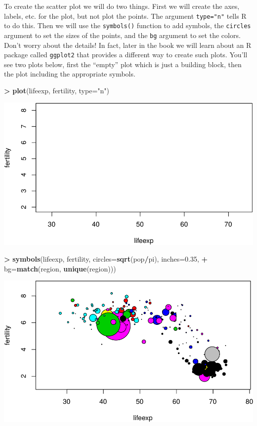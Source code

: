\documentclass[]{krantz}
\makeatletter
\newenvironment{Shaded}{\begin{snugshade}}{\end{snugshade}}
\newcommand{\DataTypeTok}[1]{\textcolor[rgb]{0.27,0.27,0.27}{#1}}
\newcommand{\FloatTok}[1]{\textcolor[rgb]{0.06,0.06,0.06}{#1}}
\newcommand{\KeywordTok}[1]{\textcolor[rgb]{0.27,0.27,0.27}{\textbf{#1}}}
\newcommand{\NormalTok}[1]{#1}
\newcommand{\OperatorTok}[1]{\textcolor[rgb]{0.43,0.43,0.43}{\textbf{#1}}}
\newcommand{\StringTok}[1]{\textcolor[rgb]{0.5,0.5,0.5}{#1}}
\newenvironment{kframe}{%
\medskip{}
\setlength{\fboxsep}{.8em}
 \def\at@end@of@kframe{}%
 \ifinner\ifhmode%
  \def\at@end@of@kframe{\end{minipage}}%
  \begin{minipage}{\columnwidth}%
 \fi\fi%
 \def\FrameCommand##1{\hskip\@totalleftmargin \hskip-\fboxsep
 \colorbox{shadecolor}{##1}\hskip-\fboxsep
     \hskip-\linewidth \hskip-\@totalleftmargin \hskip\columnwidth}%
 \MakeFramed {\advance\hsize-\width
   \@totalleftmargin\z@ \linewidth\hsize
   \@setminipage}}%
 {\par\unskip\endMakeFramed%
 \at@end@of@kframe}
\renewenvironment{Shaded}{\begin{kframe}}{\end{kframe}}
\makeatother
\begin{document}
To create the scatter plot we will do two things. First we will create the axes, labels, etc. for the plot, but not plot the points. The argument \texttt{type="n"} tells R to do this. Then we will use the \texttt{symbols()} function to add symbols, the \texttt{circles} argument to set the sizes of the points, and the \texttt{bg} argument to set the colors. Don't worry about the details! In fact, later in the book we will learn about an R package called
\texttt{ggplot2} that provides a different way to create such plots. You'll see two plots below, first the ``empty'' plot which is just a building block, then the plot including the appropriate symbols.

\begin{Shaded}
\begin{Highlighting}[]
\OperatorTok{>}\StringTok{ }\KeywordTok{plot}\NormalTok{(lifeexp, fertility, }\DataTypeTok{type=}\StringTok{"n"}\NormalTok{)}
\end{Highlighting}
\end{Shaded}

\includegraphics{bookdown_files/figure-latex/unnamed-chunk-15-1.pdf}

\begin{Shaded}
\begin{Highlighting}[]
\OperatorTok{>}\StringTok{ }\KeywordTok{symbols}\NormalTok{(lifeexp, fertility, }\DataTypeTok{circles=}\KeywordTok{sqrt}\NormalTok{(pop}\OperatorTok{/}\NormalTok{pi), }\DataTypeTok{inches=}\FloatTok{0.35}\NormalTok{, }
\OperatorTok{+}\StringTok{         }\DataTypeTok{bg=}\KeywordTok{match}\NormalTok{(region, }\KeywordTok{unique}\NormalTok{(region)))}
\end{Highlighting}
\end{Shaded}

\includegraphics{bookdown_files/figure-latex/unnamed-chunk-15-2.pdf}
\end{document}
